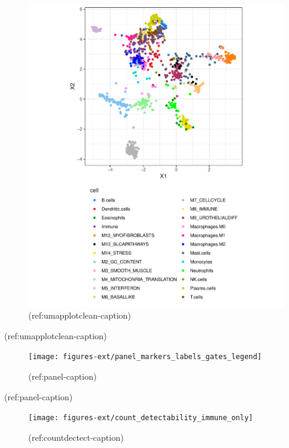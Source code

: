 \documentclass[12pt,]{book}
\theoremstyle{definition}
\theoremstyle{definition}
\theoremstyle{definition}
\theoremstyle{remark}
\begin{document}
\begin{figure}

{\centering \includegraphics[width=0.9\linewidth]{figures-ext/umap_plot_cleaned} 

}

\caption[2D representation of labelled metagenes]{(ref:umapplotclean-caption)}\label{fig:umapplotclean}
\end{figure}

(ref:umapplotclean-caption)

\begin{figure}

{\centering \texttt{[image: figures-ext/panel\_markers\_labels\_gates\_legend]} 

}

\caption[Cell markers expression in the metagenes]{(ref:panel-caption)}\label{fig:panel}
\end{figure}

(ref:panel-caption)

\begin{figure}

{\centering \texttt{[image: figures-ext/count\_detectability\_immune\_only]} 

}

\caption[Cell markers expression in the metagenes]{(ref:countdectect-caption)}\label{fig:countdectect}
\end{figure}
\end{document}
